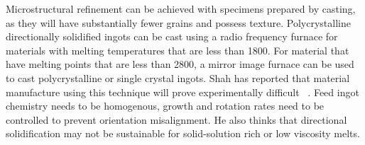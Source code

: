 Microstructural refinement can be achieved with specimens prepared by casting, as they will have substantially fewer grains and possess texture.  Polycrystalline directionally solidified ingots can be cast using a radio frequency furnace for materials with melting temperatures that are less than 1800\celsius.  For material that have melting points that are less than 2800\celsius, a mirror image furnace can be used to cast polycrystalline or single crystal ingots. Shah has reported that material manufacture using this technique will prove experimentally difficult ~\cite{shah95}.  Feed ingot chemistry needs to be homogenous, growth and rotation rates need to be controlled to prevent orientation misalignment.  He also thinks that directional solidification may not be sustainable for solid-solution rich or low viscosity melts.

